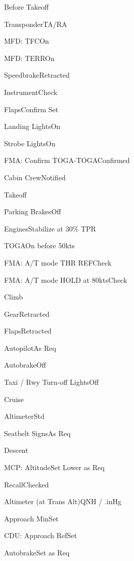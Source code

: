 \documentclass[sim-use]{checklist}
\begin{document}
\begin{checklist}{Before Takeoff}
  \item{Transponder}{TA/RA}
  \item{MFD: TFC}{On}
  \item{MFD: TERR}{On}
  \item{Speedbrake}{Retracted}
  \item{Instrument}{Check}
  \item{Flaps}{Confirm Set}
  \item{Landing Lights}{On}
  \item{Strobe Lights}{On}
  \item{FMA: Confirm TOGA-TOGA}{Confirmed}
  \item{Cabin Crew}{Notified}
\end{checklist}

\begin{checklist}{Takeoff}
  \item{Parking Brakes}{Off}
  \item{Engines}{Stabilize at 30\% TPR}
  \item{TOGA}{On before 50kts}
  \item{FMA: A/T mode THR REF}{Check}
  \item{FMA: A/T mode HOLD at 80kts}{Check}
\end{checklist}

\begin{checklist}{Climb}
  \item{Gear}{Retracted}
  \item{Flaps}{Retracted}
  \item{Autopilot}{As Req}
  \item{Autobrake}{Off}
  \item{Taxi / Rwy Turn-off Lights}{Off}
\end{checklist}

\begin{checklist}{Cruise}
  \item{Altimeter}{Std}
  \item{Seatbelt Signs}{As Req}
\end{checklist}

\begin{checklist}{Descent}
  \item{MCP: Altitude}{Set Lower as Req}
  \item{Recall}{Checked}
  \item{Altimeter (at Trans Alt)}{\blank QNH / \blank.\blank inHg}
  \item{Approach Min}{Set}
  \item{CDU: Approach Ref}{Set}
  \item{Autobrake}{Set as Req}
\end{checklist}
\end{document}
